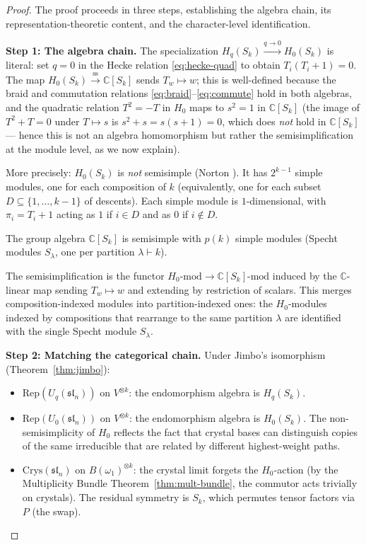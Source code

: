 \documentclass[11pt]{article}
\theoremstyle{remark}
\newcommand{\CC}{\mathbb{C}}
\newcommand{\Rep}{\mathrm{Rep}}
\newcommand{\Crys}{\mathrm{Crys}}
\newcommand{\Mod}{\text{-mod}}
\begin{document}
\begin{proof}
The proof proceeds in three steps, establishing the algebra chain, its representation-theoretic
content, and the character-level identification.

\textbf{Step 1: The algebra chain.}
The specialization $H_q(S_k) \xrightarrow{q \to 0} H_0(S_k)$ is literal:
set $q = 0$ in the Hecke relation \eqref{eq:hecke-quad} to obtain $T_i(T_i + 1) = 0$.
The map $H_0(S_k) \xrightarrow{\mathrm{ss}} \CC[S_k]$ sends $T_w \mapsto w$;
this is well-defined because the braid and commutation relations
\eqref{eq:braid}--\eqref{eq:commute} hold in both algebras, and the quadratic
relation $T^2 = -T$ in $H_0$ maps to $s^2 = 1$ in $\CC[S_k]$
(the image of $T^2 + T = 0$ under $T \mapsto s$ is $s^2 + s = s(s+1) = 0$,
which does \emph{not} hold in $\CC[S_k]$ --- hence this is not an algebra
homomorphism but rather the semisimplification at the module level, as we now explain).

More precisely: $H_0(S_k)$ is \emph{not} semisimple (Norton \cite{norton1979}).
It has $2^{k-1}$ simple modules, one for each composition of $k$
(equivalently, one for each subset $D \subseteq \{1,\ldots,k-1\}$ of descents).
Each simple module is $1$-dimensional, with $\pi_i = T_i + 1$ acting as $1$ if
$i \in D$ and as $0$ if $i \notin D$.

The group algebra $\CC[S_k]$ is semisimple with $p(k)$ simple modules
(Specht modules $S_\lambda$, one per partition $\lambda \vdash k$).

The semisimplification is the functor $H_0\Mod \to \CC[S_k]\Mod$ induced by the
$\CC$-linear map sending $T_w \mapsto w$ and extending by restriction of scalars.
This merges composition-indexed modules into partition-indexed ones: the $H_0$-modules
indexed by compositions that rearrange to the same partition $\lambda$ are identified
with the single Specht module $S_\lambda$.

\textbf{Step 2: Matching the categorical chain.}
Under Jimbo's isomorphism (Theorem~\ref{thm:jimbo}):
\begin{itemize}
  \item $\Rep(U_q(\mathfrak{sl}_n))$ on $V^{\otimes k}$: the endomorphism algebra is $H_q(S_k)$.
  \item $\Rep(U_0(\mathfrak{sl}_n))$ on $V^{\otimes k}$: the endomorphism algebra is $H_0(S_k)$.
    The non-semisimplicity of $H_0$ reflects the fact that crystal bases can
    distinguish copies of the same irreducible that are related by different
    highest-weight paths.
  \item $\Crys(\mathfrak{sl}_n)$ on $B(\omega_1)^{\otimes k}$: the crystal limit
    forgets the $H_0$-action (by the Multiplicity Bundle Theorem~\ref{thm:mult-bundle},
    the commutor acts trivially on crystals). The residual symmetry is $S_k$,
    which permutes tensor factors via $P$ (the swap).
\end{itemize}


\end{proof}
\end{document}
